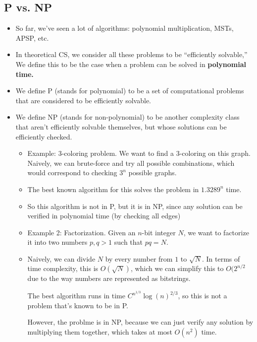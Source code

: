\subsection{P vs. NP}
\begin{itemize}
	\item So far, we've seen a lot of algorithms: polynomial multiplication, MSTs, APSP, etc.
	\item In theoretical CS, we consider all these problems to be ``efficiently solvable,'' We define 
		this to be the case when a problem can be solved in \textbf{polynomial time.}

	\item We define P (stands for polynomial) to be a set of computational problems that are considered to be
		efficiently solvable.  
	\item We define NP (stands for non-polynomial) to be another complexity class that aren't 
		efficiently solvable themselves, but whose 
		solutions can be efficiently checked. 
		\begin{itemize}
			\item Example: 3-coloring problem. We want to find a 3-coloring on this graph. Naively, 
				we can brute-force and try all possible combinations, which would correspond to checking 
				\(3^{n}\) possible graphs. 
			\item The best known algorithm for this solves the problem in \(1.3289^{n}\) time.  
			\item So this algorithm is not in P, but it is in NP, since any solution can be verified in 
				polynomial time (by checking all edges)
			\item Example 2: Factorization. Given an \(n\)-bit integer \(N\), we want to factorize it into 
				two numbers \(p, q >1\) such that $pq = N$. 
			\item Naively, we can divide \(N\) by every number from \(1\) to \(\sqrt{N} \). In terms of 
				time complexity, this is \(O(\sqrt{N} )\), which we can simplify this to \(O(2^{n /2}\) due to 
				the way numbers are represented as bitstrings. 

				The best algorithm runs in time \(C^{n^{1/3}} \log(n)^{2/3}\), so this is not a problem 
				that's known to be in P. 

				However, the problme is in NP, because we can just verify any solution by multiplying them 
				together, which takes at most \(O(n^2)\) time. 
		\end{itemize}
\end{itemize}
